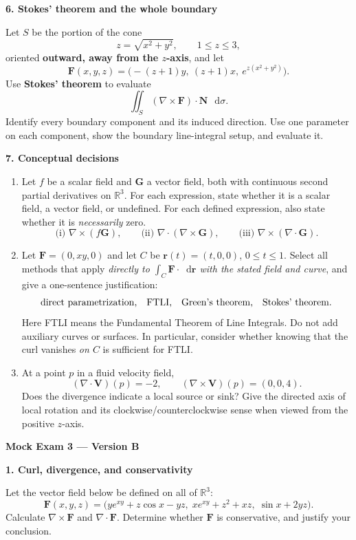 \documentclass[11pt,letterpaper]{article}
\newcommand{\curl}{\nabla\times}
\newcommand{\dv}{\nabla\cdot}
\renewcommand{\vec}[1]{\mathbf{#1}}
\newcommand{\dd}{\mathop{}\!\mathrm{d}}
\newcommand{\examproblem}[3]{%
  \par\medskip\Needspace{5\baselineskip}
  \noindent\textbf{#1. #2}\par\nobreak
}
\begin{document}
\examproblem{6}{Stokes' theorem and the whole boundary}{20}
Let $S$ be the portion of the cone
\[
z=\sqrt{x^2+y^2},\qquad1\le z\le3,
\]
oriented \textbf{outward, away from the $z$-axis}, and let
\[
\vec F(x,y,z)=\bigl(-(z+1)y,\ (z+1)x,\ e^{z(x^2+y^2)}\bigr).
\]
Use \textbf{Stokes' theorem} to evaluate
\[
\iint_S(\curl\vec F)\cdot\vec N\,\dd\sigma.
\]
Identify every boundary component and its induced direction. Use one
parameter on each component, show the boundary line-integral setup, and
evaluate it.

\examproblem{7}{Conceptual decisions}{14}
\begin{enumerate}[label=(\alph*)]
\item Let $f$ be a scalar field and $\vec G$ a vector
field, both with continuous second partial derivatives on $\mathbb R^3$.
For each expression, state whether it is a scalar field, a vector field,
or undefined. For each defined expression, also state whether it is
\emph{necessarily} zero.
\[
\text{(i) }\curl(f\vec G),\qquad
\text{(ii) }\dv(\curl\vec G),\qquad
\text{(iii) }\curl(\dv\vec G).
\]

\item Let $\vec F=(0,xy,0)$ and let
$C$ be $\vec r(t)=(t,0,0)$, $0\le t\le1$. Select all methods that apply
\emph{directly to $\int_C\vec F\cdot\dd\vec r$ with the stated field and curve}, and
give a one-sentence justification:
\[
\text{direct parametrization,\quad FTLI,\quad Green's theorem,\quad Stokes' theorem.}
\]
Here FTLI means the Fundamental Theorem of Line Integrals. Do not add
auxiliary curves or surfaces. In particular, consider whether knowing
that the curl vanishes \emph{on $C$} is sufficient for FTLI.

\item At a point $p$ in a fluid velocity field,
\[
(\dv\vec V)(p)=-2,\qquad(\curl\vec V)(p)=(0,0,4).
\]
Does the divergence indicate a local source or sink? Give the directed
axis of local rotation and its clockwise/counterclockwise sense when
viewed from the positive $z$-axis.

\end{enumerate}

\clearpage
\setcounter{page}{1}
{\large\bfseries Mock Exam 3 --- Version B}
\smallskip
\examproblem{1}{Curl, divergence, and conservativity}{10}
Let the vector field below be defined on all of $\mathbb R^3$:
\[
\vec F(x,y,z)=
\bigl(ye^{xy}+z\cos x-yz,\;
xe^{xy}+z^2+xz,\;
\sin x+2yz\bigr).
\]
Calculate $\curl\vec F$ and $\dv\vec F$. Determine whether $\vec F$
is conservative, and justify your conclusion.
\end{document}
